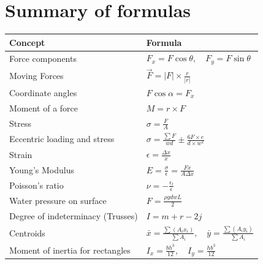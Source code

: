\documentclass{article}
\begin{document}
\section{Summary of formulas}
\small
\begin{tabular}{|l|l|}
    \hline
    \textbf{Concept}                  & \textbf{Formula}                                                                        \\\hline
    Force components                  & $F_x=F\cos\theta,\quad F_y=F\sin\theta$                                                 \\
    Moving Forces                     & $\vec{F}=|F|\times\frac{r}{|r|}$                                                        \\
    Coordinate angles                 & $F\cos\alpha = F_x$                                                                     \\
    Moment of a force                 & $M=r\times F$                                                                           \\
    Stress                            & $\sigma=\frac{F}{A}$                                                                    \\
    Eccentric loading and stress      & $\sigma=\frac{\sum F}{wd}\pm \frac{6F\times e}{d\times w^2}$                            \\
    Strain                            & $\epsilon=\frac{\Delta x}{x}$                                                           \\
    Young's Modulus                   & $E=\frac{\sigma}{\epsilon}=\frac{Fx}{A\Delta x}$                                        \\
    Poisson's ratio                   & $\nu=-\frac{\epsilon_l}{\epsilon}$                                                      \\
    Water pressure on surface         & $F = \frac{\rho gdwL}{2}$                                                               \\
    Degree of indeterminacy (Trusses) & $I=m+r-2j$                                                                              \\
    Centroids                         & $\bar{x}=\frac{\sum (A_i x_i)}{\sum A_i},\quad \bar{y}=\frac{\sum (A_i y_i)}{\sum A_i}$ \\
    Moment of inertia for rectangles  & $I_x=\frac{bh^3}{12},\quad I_y=\frac{hb^3}{12}$                                         \\

\end{tabular}
\end{document}
